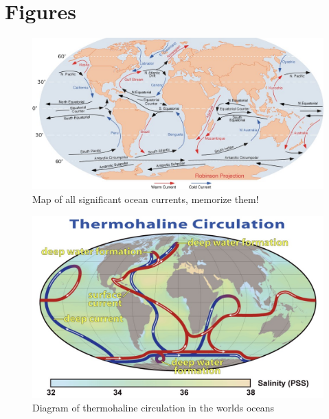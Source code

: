 \documentclass{article}
\begin{document}
\section{Figures}
\begin{figure}[H]
    \centering
    \includegraphics[width=\textwidth]{./Images/BC1_CurrentMap.jpg}
    \caption{Map of all significant ocean currents, memorize them!}
\end{figure}
\begin{figure}[H]
	\centering
	\includegraphics[width=\textwidth]{./Images/BC1_THC.jpg}
	\caption{Diagram of thermohaline circulation in the worlds oceans}
\end{figure}
\end{document}
